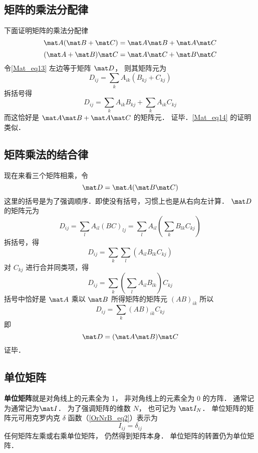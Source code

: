 \subsection{矩阵的乘法分配律}
下面证明矩阵的乘法分配律
\begin{equation}\label{Mat_eq13}
\mat A (\mat B + \mat C) = \mat A \mat B + \mat A \mat C
\end{equation}
\begin{equation}\label{Mat_eq14}
(\mat A + \mat B) \mat C = \mat A \mat C + \mat B \mat C
\end{equation}
令\autoref{Mat_eq13} 左边等于矩阵 $\mat D$， 则其矩阵元为
\begin{equation}
D_{ij} = \sum_k A_{ik} (B_{kj} + C_{kj})
\end{equation}
拆括号得
\begin{equation}
D_{ij} = \sum_k A_{ik}B_{kj} + \sum_k A_{ik}C_{kj}
\end{equation}
而这恰好是 $\mat A \mat B + \mat A \mat C$ 的矩阵元． 证毕．\autoref{Mat_eq14} 的证明类似．

\subsection{矩阵乘法的结合律}
现在来看三个矩阵相乘，令
\begin{equation}
\mat D = \mat A(\mat B\mat C)
\end{equation}
这里的括号是为了强调顺序．即使没有括号，习惯上也是从右向左计算． $\mat D$ 的矩阵元为
\begin{equation}
D_{ij} = \sum_l A_{il} (BC)_{lj} = \sum_l A_{il} \left(\sum_k B_{lk}C_{kj}\right)
\end{equation}
拆括号，得
\begin{equation}
D_{ij} = \sum_k\sum_l \left( A_{il}B_{lk}C_{kj}\right)
\end{equation}
对 $C_{kj}$ 进行合并同类项，得
\begin{equation}
D_{ij} = \sum_k \left(\sum_l A_{il}B_{lk}\right) C_{kj} 
\end{equation}
括号中恰好是 $\mat A$ 乘以 $\mat B$ 所得矩阵的矩阵元 $(AB)_{ik}$ 所以
\begin{equation}
D_{ij} = \sum_k (AB)_{ik} C_{kj}
\end{equation}
即
\begin{equation}
\mat D = (\mat A\mat B)\mat C
\end{equation}
证毕．

\subsection{单位矩阵}
\textbf{单位矩阵}就是对角线上的元素全为 1， 非对角线上的元素全为 0 的方阵． 通常记为通常记为$\mat I$． 为了强调矩阵的维数 $N$， 也可记为 $\mat I_N$． 单位矩阵的矩阵元可用克罗内克 $\delta$ 函数（\autoref{OrNrB_eq2}）表示为
\begin{equation}
I_{ij} = \delta_{ij}
\end{equation} 
任何矩阵左乘或右乘单位矩阵， 仍然得到矩阵本身． 单位矩阵的转置仍为单位矩阵．

